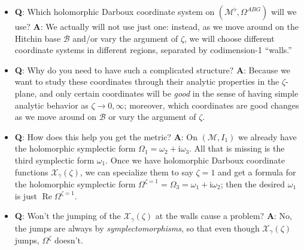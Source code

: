 \documentclass[12pt,letterpaper,reqno]{article}
\numberwithin{equation}{section}
\newcommand{\cB}{\ensuremath{\mathcal B}}
\newcommand{\cM}{\ensuremath{\mathcal M}}
\newcommand{\cX}{\ensuremath{\mathcal X}}
\newcommand{\I}{{\mathrm i}}
\newcommand{\ti}[1]{\textit{#1}}
\DeclareMathOperator{\re}{Re}
\newcommand{\insfig}[2]{

\medskip
\noindent
\begin{minipage}{\linewidth}

\makebox[\linewidth]{\texttt{[image: figures/\#1-crop.pdf]}}

\end{minipage}
\medskip

}
\begin{document}
\begin{itemize}
\item {\bf Q}: Which holomorphic Darboux coordinate system on
$(\cM^\flat, \Omega^{ABG})$ will we use? 
{\bf A}: We actually
will not use just one: instead, as we move around on the
Hitchin base $\cB$ and/or vary the argument of $\zeta$, 
we will choose different coordinate
systems in different regions, separated by codimension-1 ``walls.''

\insfig{higgs-metric-6}{0.8}

\item {\bf Q}: Why do you need to have such a complicated structure? {\bf A}: Because we want to study
these coordinates through their analytic properties in the
$\zeta$-plane, and only certain coordinates will be \ti{good} in the sense of having 
simple analytic behavior
as $\zeta \to 0, \infty$; moreover, which coordinates are good changes as
we move around on $\cB$ or vary the argument of $\zeta$.


\item {\bf Q}: How does this help you get the metric? {\bf A}: On $(\cM, I_1)$ we 
already have the holomorphic
symplectic form $\Omega_1 = \omega_2 + \I \omega_3$. All that
is missing is the third symplectic form $\omega_1$.
Once we have holomorphic Darboux coordinate functions $\cX_\gamma(\zeta)$,
we can specialize them to say $\zeta = 1$ and get a formula
for the holomorphic symplectic form $\Omega^{\zeta = 1} = \Omega_3 = \omega_1 + \I \omega_2$; then the desired $\omega_1$ is just
$\re \Omega^{\zeta = 1}$.

\item {\bf Q}: Won't the jumping of the $\cX_\gamma(\zeta)$ at the walls
cause a problem? {\bf A}: No, the jumps are always by \ti{symplectomorphisms},
so that even though $\cX_\gamma(\zeta)$ jumps, $\Omega^\zeta$ doesn't.
\end{itemize}
\end{document}
